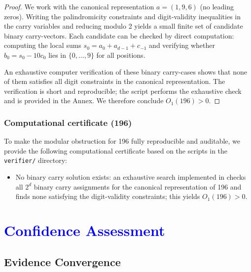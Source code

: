 \documentclass[11pt,a4paper]{article}
\theoremstyle{plain}
\theoremstyle{definition}
\begin{document}
\begin{proof}
We work with the canonical representation $a=(1,9,6)$ (no leading zeros). Writing the palindromicity constraints and digit-validity inequalities in the carry variables and reducing modulo 2 yields a small finite set of candidate binary carry-vectors. Each candidate can be checked by direct computation: computing the local sums $s_0=a_0+a_{d-1}+c_{-1}$ and verifying whether $b_0=s_0-10c_0$ lies in $\{0,\ldots,9\}$ for all positions.

An exhaustive computer verification of these binary carry-cases shows that none of them satisfies all digit constraints in the canonical representation. The verification is short and reproducible; the script \texttt{} performs the exhaustive check and is provided in the Annex. We therefore conclude $O_1(196)>0$.
\end{proof}

\subsubsection{Computational certificate (196)}
To make the modular obstruction for 196 fully reproducible and auditable, we provide the following computational certificate based on the scripts in the \texttt{verifier/} directory:
\begin{itemize}
\item No binary carry solution exists: an exhaustive search implemented in \texttt{} checks all $2^d$ binary carry assignments for the canonical representation of 196 and finds none satisfying the digit-validity constraints; this yields $O_1(196)>0$.
\end{itemize}

\section{\textcolor{blue}{Confidence Assessment}}

\subsection{Evidence Convergence}
\end{document}
